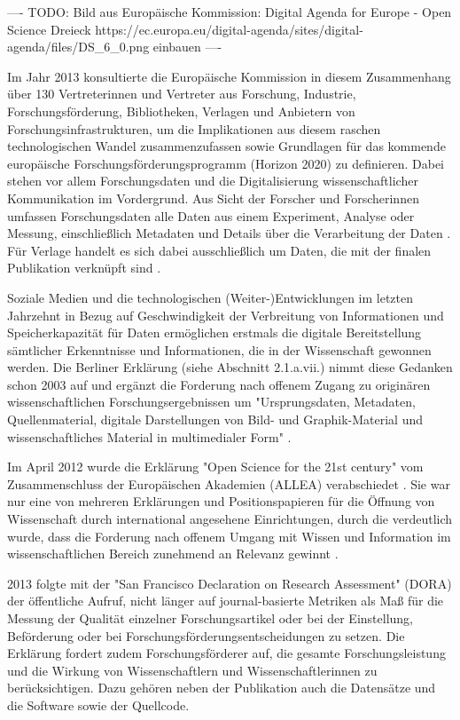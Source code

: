 ---- TODO: Bild aus Europäische Kommission: Digital Agenda for Europe - Open Science Dreieck https://ec.europa.eu/digital-agenda/sites/digital-agenda/files/DS_6_0.png einbauen ----

Im Jahr 2013 konsultierte die Europäische Kommission in diesem Zusammenhang über 130 Vertreterinnen und Vertreter aus Forschung, Industrie, Forschungsförderung, Bibliotheken, Verlagen und Anbietern von Forschungsinfrastrukturen, um die Implikationen aus diesem raschen technologischen Wandel zusammenzufassen sowie Grundlagen für das kommende europäische Forschungsförderungsprogramm (Horizon 2020) zu definieren. Dabei stehen vor allem Forschungsdaten und die Digitalisierung wissenschaftlicher Kommunikation im Vordergrund. Aus Sicht der Forscher und Forscherinnen umfassen Forschungsdaten alle Daten aus einem Experiment, Analyse oder Messung, einschließlich Metadaten und Details über die Verarbeitung der Daten \cite{European_Commission_2013}. Für Verlage handelt es sich dabei ausschließlich um Daten, die mit der finalen Publikation verknüpft sind \cite{European_Commission_2013}.

Soziale Medien und die technologischen (Weiter-)Entwicklungen im letzten Jahrzehnt in Bezug auf Geschwindigkeit der Verbreitung von Informationen und Speicherkapazität für Daten ermöglichen erstmals die digitale Bereitstellung sämtlicher Erkenntnisse und Informationen, die in der Wissenschaft gewonnen werden. Die Berliner Erklärung (siehe Abschnitt 2.1.a.vii.) nimmt diese Gedanken schon 2003 auf und ergänzt die Forderung nach offenem Zugang zu originären wissenschaftlichen Forschungsergebnissen um "Ursprungsdaten, Metadaten, Quellenmaterial, digitale Darstellungen von Bild- und Graphik-Material und wissenschaftliches Material in multimedialer Form" \cite{Berliner_Erklaerung_2003}.

Im April 2012 wurde die Erklärung "Open Science for the 21st century" vom Zusammenschluss der Europäischen Akademien (ALLEA) verabschiedet \cite{ALLEA_2012}. Sie war nur eine von mehreren Erklärungen und Positionspapieren für die Öffnung von Wissenschaft durch international angesehene Einrichtungen, durch die verdeutlich wurde, dass die Forderung nach offenem Umgang mit Wissen und Information im wissenschaftlichen Bereich zunehmend an Relevanz gewinnt \cite{Schulze_2013}.

2013 folgte mit der "San Francisco Declaration on Research Assessment" (DORA) \cite{DORA_2013} der öffentliche Aufruf, nicht länger auf journal-basierte Metriken als Maß für die Messung der Qualität einzelner Forschungsartikel oder bei der Einstellung, Beförderung oder bei Forschungsförderungsentscheidungen zu setzen. Die Erklärung fordert zudem Forschungsförderer auf, die gesamte Forschungsleistung und die Wirkung von Wissenschaftlern und Wissenschaftlerinnen zu berücksichtigen. Dazu gehören neben der Publikation auch die Datensätze und die Software sowie der Quellcode.

